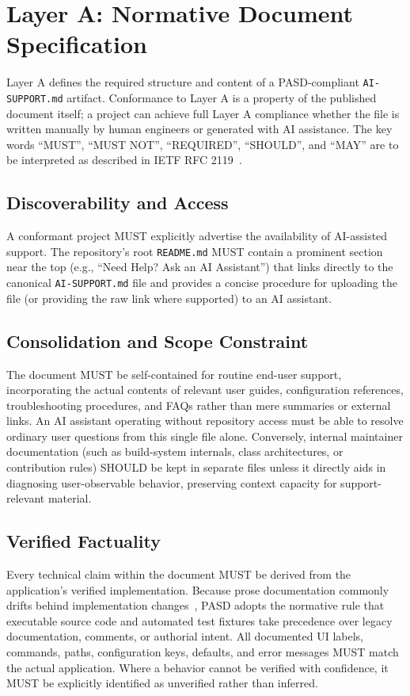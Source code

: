 \documentclass[12pt, a4paper]{article}
\begin{document}
\section{Layer A: Normative Document Specification}
\label{sec:requirements}

Layer A defines the required structure and content of a PASD-compliant \texttt{AI-SUPPORT.md} artifact. Conformance to Layer A is a property of the published document itself; a project can achieve full Layer A compliance whether the file is written manually by human engineers or generated with AI assistance. The key words ``MUST'', ``MUST NOT'', ``REQUIRED'', ``SHOULD'', and ``MAY'' are to be interpreted as described in IETF RFC 2119~\citep{bradner1997rfc2119}.

\subsection{Discoverability and Access}
A conformant project MUST explicitly advertise the availability of AI-assisted support. The repository's root \texttt{README.md} MUST contain a prominent section near the top (e.g., ``Need Help? Ask an AI Assistant'') that links directly to the canonical \texttt{AI-SUPPORT.md} file and provides a concise procedure for uploading the file (or providing the raw link where supported) to an AI assistant.

\subsection{Consolidation and Scope Constraint}
The document MUST be self-contained for routine end-user support, incorporating the actual contents of relevant user guides, configuration references, troubleshooting procedures, and FAQs rather than mere summaries or external links. An AI assistant operating without repository access must be able to resolve ordinary user questions from this single file alone. Conversely, internal maintainer documentation (such as build-system internals, class architectures, or contribution rules) SHOULD be kept in separate files unless it directly aids in diagnosing user-observable behavior, preserving context capacity for support-relevant material.

\subsection{Verified Factuality}
Every technical claim within the document MUST be derived from the application's verified implementation. Because prose documentation commonly drifts behind implementation changes~\citep{lethbridge2003software}, PASD adopts the normative rule that executable source code and automated test fixtures take precedence over legacy documentation, comments, or authorial intent. All documented UI labels, commands, paths, configuration keys, defaults, and error messages MUST match the actual application. Where a behavior cannot be verified with confidence, it MUST be explicitly identified as unverified rather than inferred.
\end{document}
